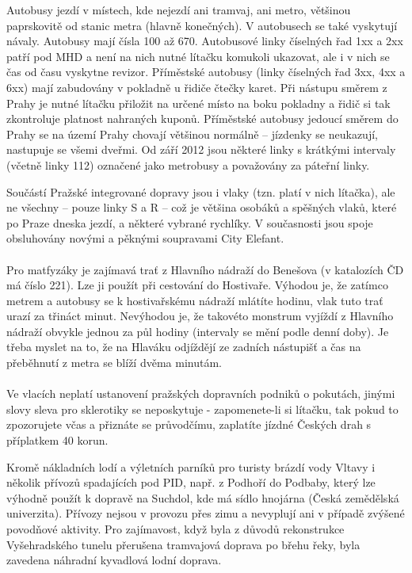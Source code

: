 Autobusy jezdí v místech, kde nejezdí ani tramvaj, ani metro, většinou
paprskovitě od stanic metra (hlavně konečných). V autobusech se také vyskytují
návaly. Autobusy mají čísla 100 až 670. Autobusové linky číselných řad 1xx a 2xx
patří pod MHD a není na nich nutné lítačku komukoli ukazovat, ale i v nich se
čas od času vyskytne revizor. Příměstské autobusy (linky číselných řad 3xx, 4xx
a 6xx) mají zabudovány v pokladně u řidiče čtečky karet. Při nástupu směrem z
Prahy je nutné lítačku přiložit na určené místo na boku pokladny a řidič si tak
zkontroluje platnost nahraných kuponů. Příměstské autobusy jedoucí směrem do
Prahy se na území Prahy chovají většinou normálně – jízdenky se neukazují,
nastupuje se všemi dveřmi. Od září 2012 jsou některé linky s krátkými intervaly
(včetně linky 112) označené jako metrobusy a považovány za páteřní linky.

Součástí Pražské integrované dopravy jsou i vlaky (tzn. platí v nich lítačka),
ale ne všechny – pouze linky S a R – což je většina osobáků a spěšných vlaků,
které po Praze dneska jezdí, a některé vybrané rychlíky. V současnosti jsou
spoje obsluhovány novými a pěknými soupravami City Elefant.
\\\\
Pro matfyzáky je zajímavá trať z Hlavního nádraží do Benešova (v katalozích ČD
má číslo 221). Lze ji použít při cestování do Hostivaře. Výhodou je, že zatímco
metrem a autobusy se k hostivařskému nádraží mlátíte hodinu, vlak tuto trať
urazí za třináct minut. Nevýhodou je, že takovéto monstrum vyjíždí z Hlavního
nádraží obvykle jednou za půl hodiny (intervaly se mění podle denní doby). Je
třeba myslet na to, že na Hlaváku odjíždějí ze zadních nástupišť a čas na
přeběhnutí z metra se blíží dvěma minutám.
\\\\
Ve vlacích neplatí ustanovení pražských dopravních podniků o pokutách, jinými
slovy sleva pro sklerotiky se neposkytuje - zapomenete-li si lítačku, tak pokud
to zpozorujete včas a přiznáte se průvodčímu, zaplatíte jízdné Českých drah s
příplatkem 40 korun.

Kromě nákladních lodí a výletních parníků pro turisty brázdí vody Vltavy i
několik přívozů spadajících pod PID, např. z Podhoří do Podbaby, který lze
výhodně použít k dopravě na Suchdol, kde má sídlo hnojárna (Česká zemědělská
univerzita). Přívozy nejsou v provozu přes zimu a nevyplují ani v případě
zvýšené povodňové aktivity. Pro zajímavost, když byla z důvodů rekonstrukce
Vyšehradského tunelu přerušena tramvajová doprava po břehu řeky, byla zavedena
náhradní kyvadlová lodní doprava.

